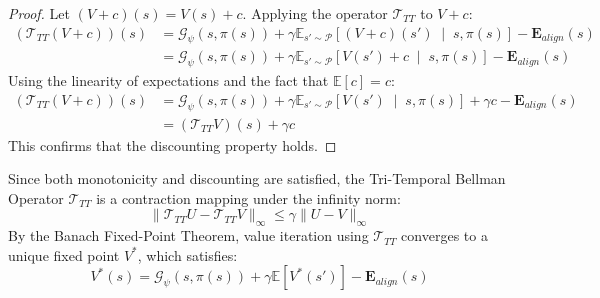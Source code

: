 \documentclass[manuscript, screen, review]{jair}
\begin{document}
\begin{proof}
Let $(V+c)(s) = V(s) + c$. Applying the operator $\mathcal{T}_{TT}$ to $V+c$:
\begin{align*}
    \left( \mathcal{T}_{TT} (V + c) \right)(s) &= \mathcal{G}_\psi(s, \pi(s)) + \gamma \mathbb{E}_{s' \sim \mathcal{P}} \left[ (V + c)(s') \;\middle|\; s, \pi(s) \right] - \mathbf{E}_{align}(s) \\
    &= \mathcal{G}_\psi(s, \pi(s)) + \gamma \mathbb{E}_{s' \sim \mathcal{P}} \left[ V(s') + c \;\middle|\; s, \pi(s) \right] - \mathbf{E}_{align}(s)
\end{align*}
Using the linearity of expectations and the fact that $\mathbb{E}[c] = c$:
\begin{align*}
    \left( \mathcal{T}_{TT} (V + c) \right)(s) &= \mathcal{G}_\psi(s, \pi(s)) + \gamma \mathbb{E}_{s' \sim \mathcal{P}} \left[ V(s') \;\middle|\; s, \pi(s) \right] + \gamma c - \mathbf{E}_{align}(s) \\
    &= \left( \mathcal{T}_{TT} V \right)(s) + \gamma c
\end{align*}
This confirms that the discounting property holds.
\end{proof}

Since both monotonicity and discounting are satisfied, the Tri-Temporal Bellman Operator $\mathcal{T}_{TT}$ is a contraction mapping under the infinity norm:
\begin{equation}
    \| \mathcal{T}_{TT} U - \mathcal{T}_{TT} V \|_\infty \le \gamma \| U - V \|_\infty
\end{equation}
By the Banach Fixed-Point Theorem, value iteration using $\mathcal{T}_{TT}$ converges to a unique fixed point $V^*$, which satisfies:
\begin{equation*}
    V^*(s) = \mathcal{G}_\psi(s, \pi(s)) + \gamma \mathbb{E} [V^*(s')] - \mathbf{E}_{align}(s)
\end{equation*}
\end{document}
